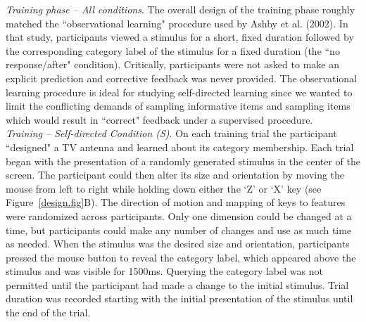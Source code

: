 \documentclass[3p,twocolumn,authoryear,10pt]{elsarticle}
\begin{document}
\textit{Training phase -- All conditions}. The overall design of the training phase roughly matched the ``observational learning" procedure used by Ashby et al. (2002).  In that study, participants viewed a stimulus for a short, fixed duration followed by the corresponding category label of the stimulus for a fixed duration (the ``no response/after" condition).  Critically, participants were not asked to make an explicit prediction and corrective feedback was never provided.  The observational learning procedure is ideal for studying self-directed learning since we wanted to limit the conflicting demands of sampling informative items and sampling items which would result in ``correct" feedback under a supervised procedure.\\

\noindent
\textit{Training -- Self-directed Condition (S)}.  On each training trial the participant ``designed" a TV antenna and learned about its category membership. Each trial began with the presentation of a randomly generated stimulus in the center of the screen. The participant could then alter its size and orientation by moving the mouse from left to right while holding down either the `Z' or `X' key (see Figure~\ref{design.fig}B). The direction of motion and mapping of keys to features were randomized across participants. Only one dimension could be changed at a time, but participants could make any number of changes and use as much time as needed. When the stimulus was the desired size and orientation, participants pressed the mouse button to reveal the category label, which appeared above the stimulus and was visible for 1500ms. Querying the category label was not permitted until the participant had made a change to the initial stimulus. Trial duration was recorded starting with the initial presentation of the stimulus until the end of the trial. \\
\end{document}
